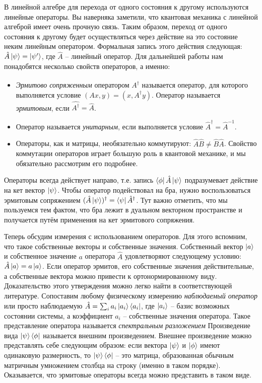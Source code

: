 В линейной алгебре для перехода от одного состояния к другому используются линейные операторы. Вы наверняка заметили, что квантовая механика с линейной алгеброй имеет очень прочную связь. Таким образом, переход от одного состояния к другому будет осуществляться через действие на это состояние неким линейным оператором. Формальная запись этого действия следующая: $\hat{A}\ket{\psi} = \ket{\psi'}$, где $\hat{A}$ -- линейный оператор. Для дальнейшей работы нам понадобятся несколько свойств операторов, а именно:
\begin{itemize}
    \item \textit{Эрмитово сопряженным} оператором $\hat{A^{\dagger}}$ называется оператор, для которого выполняется условие $(Ax, y) = (x, A^{\dagger}y)$. Оператор называется \textit{эрмитовым}, если $\hat{A^{\dagger}} = \hat{A}$.
    \item Оператор называется \textit{унитарным}, если выполняется условие $\hat{A}^{\dagger} = \hat{A}^{-1}$.
    \item Операторы, как и матрицы, необязательно коммутируют: $\hat{A}\hat{B} \neq \hat{B}\hat{A}$. Свойство коммутации операторов играет большую роль в квантовой механике, и мы обязательно рассмотрим его подробнее.
\end{itemize}
Операторы всегда действует направо, т.е. запись $\bra{\phi}\hat{A}\ket{\psi}$ подразумевает действие на кет вектор $\ket{\psi}$. Чтобы оператор подействовал на бра, нужно воспользоваться эрмитовым сопряжением $(\hat{A}\ket{\psi})^{\dagger} = \bra{\psi}\hat{A}^{\dagger}$. Тут важно отметить, что мы пользуемся тем фактом, что бра лежит в дуальном векторном пространстве и получается путём применения на кет эрмитового сопряжения.

Теперь обсудим измерения с использованием операторов. Для этого вспомним, что такое собственные векторы и собственные значения. Собственный вектор $\ket{a}$ и собственное значение $a$ оператора $\hat{A}$ удовлетворяют следующему условию: $\hat{A}\ket{a} = a\ket{a}$. Если оператор эрмитов, его собственные значения действительные, а собственные вектора можно привести к ортонормированному виду. Доказательство этого утверждения можно легко найти в соответствующей литературе. Сопоставим любому физическому измерению \textit{наблюдаемый оператор} или просто наблюдаемую $\hat{A} = \sum_i a_i \ket{a_i}\bra{a_i}$, где  $\ket{a_i}$ -- базис возможных состоянии системы, а коэффициент $a_i$ -- собственные значения оператора. Такое представление оператора называется \textit{спектральным разложением} Произведение вида $\ket{\psi}\bra{\phi}$ называется внешним произведением. Внешнее произведение можно представлять себе следующим образом: если вектора $\ket{\psi}$ и $\ket{\phi}$ имеют одинаковую размерность, то $\ket{\psi}\bra{\phi}$ -- это матрица, образованная обычным матричным умножением столбца на строку (именно в таком порядке). Оказывается, что эрмитовые операторы всегда можно представить в таком виде.

